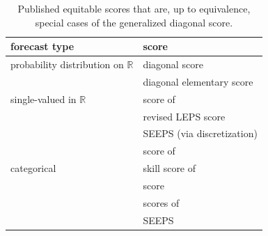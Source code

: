 \documentclass[10pt]{article} %
\theoremstyle{theorem}
\theoremstyle{definition}
\newcommand{\RRR}{\mathbb{R}}
\begin{document}
\begin{table}[t!]
    \renewcommand{\arraystretch}{1.5} %
    \centering \small
    \begin{tabular}{|l|l|}
    \hline
	forecast type & score \\
   \hline
	probability distribution on $\RRR$ & diagonal score \citep{ben2018diagonal} \\
		& diagonal elementary score \citep{ben2018diagonal} \\
   \hline
	single-valued in $\RRR$ & score of \citet{gringorten1965measure} \\
		& revised LEPS score \citep{potts1996revised} \\
		& SEEPS \citep{rodwell2010new} (via discretization) \\
		& score of \cite{ben2021verification} \\
   \hline
	categorical & skill score of \citet{peirce1884numerical} \\
		& \citet{gerrity1992note} score \\
		& scores of \citet{barnston1992correspondence} \\
		& SEEPS \citep{rodwell2010new} \\
    \hline
    \end{tabular}
    \caption{Published equitable scores that are, up to equivalence, special cases of the generalized diagonal score.}
    \label{tab:scores in GDS form}
\end{table}
\end{document}
